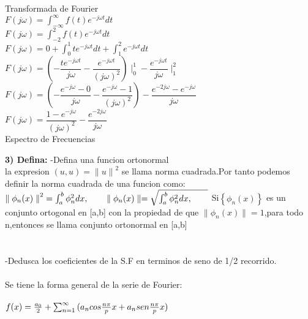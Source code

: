 \documentclass[10pt,a4paper]{article}
\begin{document}
\begin{center}
Transformada de Fourier\\
$\displaystyle{F(j \omega) = \int_{-\infty}^{\infty} f(t) e^{-j \omega t} dt}$\\
$\displaystyle{F(j \omega) = \int_{-2}^{2} f(t) e^{-j \omega t} dt}$\\
$\displaystyle{F(j \omega) = 0 + \int_{0}^{1} t e^{-j \omega t} dt + \int_{1}^{2} e^{-j \omega t} dt}$\\
$\displaystyle{F(j \omega) =(-\dfrac{ t e^{-j \omega t}}{j \omega} - \dfrac{e^{-j \omega t}}{(j \omega)^2}) \mid_{0}^ {1} - \dfrac{ e^{-j \omega t}}{j \omega} \mid_{1}^{2}}$\\
$\displaystyle{F(j \omega) =(-\dfrac{e^{-j \omega }-0}{j \omega} - \dfrac{e^{-j \omega} - 1}{(j \omega)^2}) - \dfrac{ e^{-2j \omega }- e^{-j \omega }}{j \omega} }$\\
$\displaystyle{F(j \omega) =  \dfrac{1-e^{-j \omega}}{(j \omega)^2}  - \dfrac{ e^{-2j \omega }}{j \omega}}$\\
Espectro de Frecuencias

\end{center}
\textbf{3) Defina:}
-Defina una funcion ortonormal\\
la expresion $\left( u,u \right) ={ \parallel u\parallel  }^{ 2 }$ se llama norma cuadrada.Por tanto podemos definir la norma cuadrada de una funcion como:\\
$
{ \parallel { \phi  }_{ n }(x)\parallel  }^{ 2 }=\int _{ a }^{ b }{ { \phi  }_{ n }^{ 2 }dx,\quad \quad  } \parallel { \phi  }_{ n }(x)\parallel =\sqrt { \int _{ a }^{ b }{ { \phi  }_{ n }^{ 2 }dx,\quad \quad  }  } \\ 
$
Si$\left\{ { \phi  }_{ n }(x) \right\}$ es un conjunto ortogonal en [a,b] con la propiedad de que $\parallel { \phi  }_{ n }(x)\parallel =1$,para todo n,entonces se llama conjunto ortonormal en [a,b]\\\\\\
-Dedusca los coeficientes de la S.F en terminos de seno de 1/2 recorrido.\\\\
Se tiene la forma general de la serie de Fourier:\\\\
$f(x)=\frac { { a }_{ 0 } }{ 2 } +\sum _{ n=1 }^{ \infty  }{ ({ a }_{ n }cos\frac { n\pi  }{ p } x+{ a }_{ n }sen\frac { n\pi  }{ p } x) } \\ $\\\\
\end{document}
